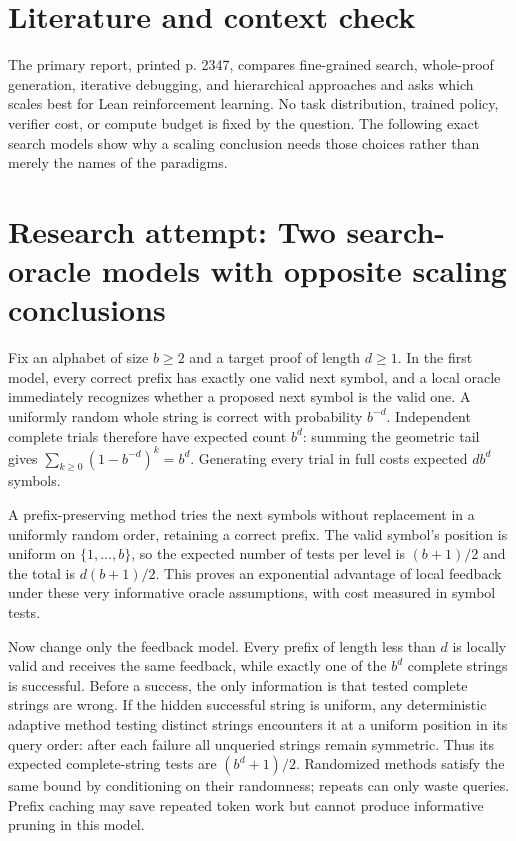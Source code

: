\documentclass[11pt]{article}
\begin{document}
\section{Literature and context check}
The primary report, printed p. 2347, compares fine-grained search, whole-proof generation, iterative debugging, and hierarchical approaches and asks which scales best for Lean reinforcement learning. No task distribution, trained policy, verifier cost, or compute budget is fixed by the question. The following exact search models show why a scaling conclusion needs those choices rather than merely the names of the paradigms.
\section{Research attempt: Two search-oracle models with opposite scaling conclusions}

Fix an alphabet of size $b\geq2$ and a target proof of length $d\geq1$. In the first model, every correct prefix has exactly one valid next symbol, and a local oracle immediately recognizes whether a proposed next symbol is the valid one. A uniformly random whole string is correct with probability $b^{-d}$. Independent complete trials therefore have expected count $b^d$: summing the geometric tail gives $\sum_{k\geq0}(1-b^{-d})^k=b^d$. Generating every trial in full costs expected $d b^d$ symbols.

A prefix-preserving method tries the next symbols without replacement in a uniformly random order, retaining a correct prefix. The valid symbol's position is uniform on $\{1,\ldots,b\}$, so the expected number of tests per level is $(b+1)/2$ and the total is $d(b+1)/2$. This proves an exponential advantage of local feedback under these very informative oracle assumptions, with cost measured in symbol tests.

Now change only the feedback model. Every prefix of length less than $d$ is locally valid and receives the same feedback, while exactly one of the $b^d$ complete strings is successful. Before a success, the only information is that tested complete strings are wrong. If the hidden successful string is uniform, any deterministic adaptive method testing distinct strings encounters it at a uniform position in its query order: after each failure all unqueried strings remain symmetric. Thus its expected complete-string tests are $(b^d+1)/2$. Randomized methods satisfy the same bound by conditioning on their randomness; repeats can only waste queries. Prefix caching may save repeated token work but cannot produce informative pruning in this model.
\end{document}
